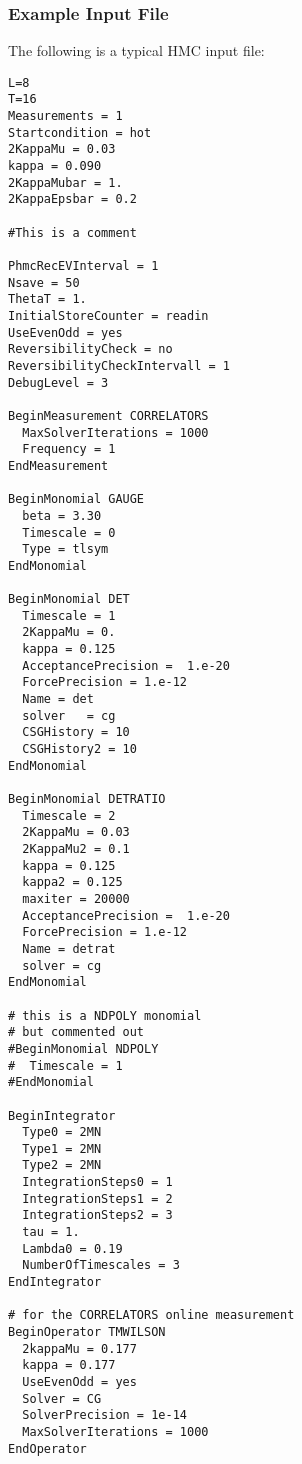\subsubsection{Example Input File}

The following is a typical HMC input file:
\begin{verbatim}
L=8
T=16
Measurements = 1
Startcondition = hot
2KappaMu = 0.03
kappa = 0.090
2KappaMubar = 1.
2KappaEpsbar = 0.2

#This is a comment

PhmcRecEVInterval = 1
Nsave = 50
ThetaT = 1.
InitialStoreCounter = readin
UseEvenOdd = yes
ReversibilityCheck = no
ReversibilityCheckIntervall = 1
DebugLevel = 3

BeginMeasurement CORRELATORS
  MaxSolverIterations = 1000
  Frequency = 1
EndMeasurement

BeginMonomial GAUGE
  beta = 3.30
  Timescale = 0
  Type = tlsym
EndMonomial

BeginMonomial DET
  Timescale = 1
  2KappaMu = 0.
  kappa = 0.125
  AcceptancePrecision =  1.e-20
  ForcePrecision = 1.e-12
  Name = det
  solver   = cg
  CSGHistory = 10
  CSGHistory2 = 10
EndMonomial

BeginMonomial DETRATIO
  Timescale = 2
  2KappaMu = 0.03
  2KappaMu2 = 0.1
  kappa = 0.125
  kappa2 = 0.125
  maxiter = 20000
  AcceptancePrecision =  1.e-20
  ForcePrecision = 1.e-12
  Name = detrat
  solver = cg
EndMonomial

# this is a NDPOLY monomial
# but commented out
#BeginMonomial NDPOLY
#  Timescale = 1
#EndMonomial

BeginIntegrator 
  Type0 = 2MN
  Type1 = 2MN
  Type2 = 2MN
  IntegrationSteps0 = 1
  IntegrationSteps1 = 2
  IntegrationSteps2 = 3
  tau = 1.
  Lambda0 = 0.19
  NumberOfTimescales = 3
EndIntegrator

# for the CORRELATORS online measurement
BeginOperator TMWILSON
  2kappaMu = 0.177
  kappa = 0.177
  UseEvenOdd = yes
  Solver = CG
  SolverPrecision = 1e-14
  MaxSolverIterations = 1000
EndOperator
\end{verbatim}

